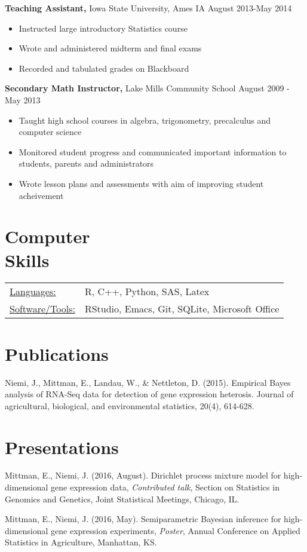 \documentclass[margin]{res}
\begin{document}
\begin{resume}
{\bf Teaching Assistant,} Iowa State University, Ames IA \hfill August 2013-May 2014
\begin{itemize} \itemsep -2pt
\item Instructed large introductory Statistics course
\item Wrote and administered midterm and final exams
\item Recorded and tabulated grades on Blackboard
\end{itemize}

{\bf Secondary Math Instructor,} Lake Mills Community School \hfill
August 2009 - May 2013                
                \begin{itemize} \itemsep -2pt
                 \item  Taught high school courses in algebra, trigonometry, precalculus and computer science
                 \item Monitored student progress and communicated important information to students, parents and administrators
                 \item Wrote lesson plans and assessments with aim of improving student acheivement

		 \end{itemize}



\section{Computer \\ Skills}
   \begin{tabular}{l p{3in}}
    \underline{Languages:} & R, C++, Python, SAS, Latex\\
    \underline{Software/Tools:} &  RStudio, Emacs, Git, SQLite, Microsoft Office
 \end{tabular}

\section{Publications}
Niemi, J., Mittman, E., Landau, W., \& Nettleton, D. (2015).
Empirical Bayes analysis of RNA-Seq data for detection of gene expression heterosis. Journal of agricultural, biological, and environmental statistics, 20(4), 614-628.

\section{Presentations}
Mittman, E., Niemi, J. (2016, August). Dirichlet process mixture model for high-dimensional
gene expression data, {\em Contributed talk}, Section on Statistics in Genomics and Genetics, Joint Statistical Meetings, Chicago, IL. 

Mittman, E., Niemi, J. (2016, May). Semiparametric Bayesian inference for high-dimensional gene expression experiments, {\em Poster}, Annual Conference on Applied Statistics in Agriculture, Manhattan, KS.

\end{resume} 
\end{document}
